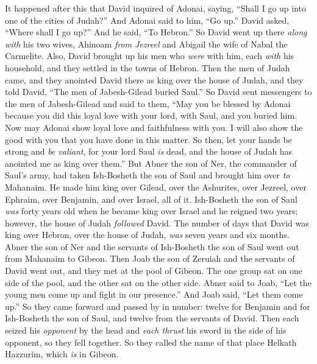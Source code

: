 \begin{biblechapter} %
 It happened after this that David inquired of Adonai, saying, “Shall I go up into one of the cities of Judah?” And Adonai said to him, “Go up.” David asked, “Where shall I go up?” And he said, “To Hebron.”
\verse So David went up there \textit{along with} his two wives, Ahinoam \textit{from Jezreel} and Abigail the wife of Nabal the Carmelite.
\verse Also, David brought up his men who \textit{were} with him, each \textit{with} his household, and they settled in the towns of Hebron.
 Then the men of Judah came, and they anointed David there as king over the house of Judah, and they told David, “The men of Jabesh-Gilead buried Saul.”
\verse So David sent messengers to the men of Jabesh-Gilead and said to them, “May you be blessed by Adonai because you did this loyal love with your lord, with Saul, and you buried him.
\verse Now may Adonai show loyal love and faithfulness with you. I will also show the good with you that you have done in this matter.
\verse So then, let your hands be strong and \textit{be valiant}, for your lord Saul \textit{is} dead, and the house of Judah has anointed me as king over them.”
 But Abner the son of Ner, the commander of Saul’s army, had taken Ish-Bosheth the son of Saul and brought him over \textit{to} Mahanaim.
\verse He made him king over Gilead, over the Ashurites, over Jezreel, over Ephraim, over Benjamin, and over Israel, all of it.
\verse Ish-Bosheth the son of Saul \textit{was} forty years old when he became king over Israel and he reigned two years; however, the house of Judah \textit{followed} David.
\verse The number of days that David was king over Hebron, over the house of Judah, \textit{was} seven years and six months.
 Abner the son of Ner and the servants of Ish-Bosheth the son of Saul went out from Mahanaim to Gibeon.
\verse Then Joab the son of Zeruiah and the servants of David went out, and they met at the pool of Gibeon. The one group sat on one side of the pool, and the other sat on the other side.
\verse Abner said to Joab, “Let the young men come up and fight in our presence.” And Joab said, “Let them come up.”
\verse So they came forward and passed by in number: twelve for Benjamin and for Ish-Bosheth the son of Saul, and twelve from the servants of David.
\verse Then each seized his \textit{opponent} by the head and \textit{each thrust} his sword in the side of his opponent, so they fell together. So they called the name of that place Helkath Hazzurim, which \textit{is} in Gibeon.

\end{biblechapter}

